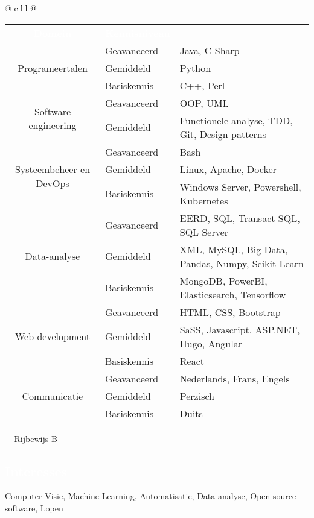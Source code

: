 \documentclass[a4paper, twoside]{article}
\begin{document}
\begin{tabu}{@{} c|l|l @{}}
\begin{tabular}{c|l|l @{}}
\cellcolor{blueDark}\textcolor{white}{\textbf{ Domein }} &
\cellcolor{blueDark}\textcolor{white}{\textbf{ Kennisniveau }} &
\cellcolor{blueDark}\\
\multirow{ 3 }{*}{ Programeertalen }
& Geavanceerd & Java, C Sharp \\
& Gemiddeld & Python \\
& Basiskennis & C++, Perl \\
\hline
\multirow{ 2 }{*}{ Software engineering }
& Geavanceerd & OOP, UML \\
& Gemiddeld & Functionele analyse, TDD, Git, Design patterns \\
\hline
\multirow{ 3 }{*}{ Systeembeheer en DevOps }
& Geavanceerd & Bash \\
& Gemiddeld & Linux, Apache, Docker \\
& Basiskennis & Windows Server, Powershell, Kubernetes \\
\hline
\multirow{ 3 }{*}{ Data-analyse }
& Geavanceerd & EERD, SQL, Transact-SQL, SQL Server \\
& Gemiddeld & XML, MySQL, Big Data, Pandas, Numpy, Scikit Learn \\
& Basiskennis & MongoDB, PowerBI, Elasticsearch, Tensorflow \\
\hline
\multirow{ 3 }{*}{ Web development }
& Geavanceerd & HTML, CSS, Bootstrap \\
& Gemiddeld & SaSS, Javascript, ASP.NET, Hugo, Angular \\
& Basiskennis & React \\
\hline
\multirow{ 3 }{*}{ Communicatie }
& Geavanceerd & Nederlands, Frans, Engels \\
& Gemiddeld & Perzisch \\
& Basiskennis & Duits \\
\hline
\end{tabular}
\end{tabu}
\ignorespaces
\noindent + Rijbewijs B
\begin{mdframed}
\section*{\textcolor{white}{ Interesses }}
\end{mdframed}
\noindent
Computer Visie, Machine Learning, Automatisatie, Data analyse, Open source software, Lopen
\end{document}
